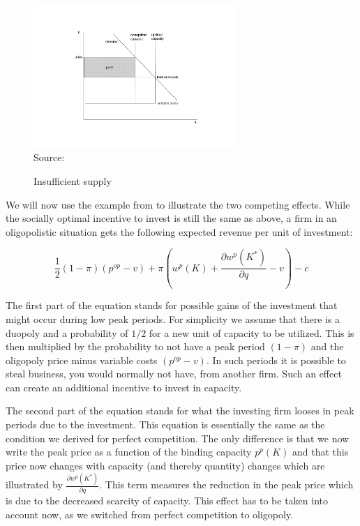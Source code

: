 \begin{figure}[h]
\centering
\caption{Insufficient supply}
\includegraphics[width=3.0in]{capacity/imperfect_spot_pricing2}
      \label{peak_load_insufficient}  
\\          
\scriptsize Source: \cite{Fehr1995}
\end{figure}

We will now use the example from \cite{Fehr1995} to illustrate the two competing effects.
While the socially optimal incentive to invest is still the same as above, a firm in an oligopolistic situation gets the following expected revenue per unit of investment:

\begin{equation*}
	\frac{1}{2} (1-\pi) (p^{op}-v) + \pi \left(w^p(K)+\frac{\partial w^p(K^*)}{\partial q}-v\right) - c
\end{equation*}

The first part of the equation stands for possible gains of the investment that might occur during low peak periods. For simplicity we assume that there is a duopoly and a probability of $1/2$ for a new unit of capacity to be utilized. This is then multiplied by the probability to not have a peak period $(1-\pi)$ and the oligopoly price minus variable costs $(p^{op}-v)$. In such periods it is possible to steal business, you would normally not have, from another firm. Such an effect can create an additional incentive to invest in capacity. %

The second part of the equation stands for what the investing firm looses in peak periods due to the investment. This equation is essentially the same as the condition we derived for perfect competition. The only difference is that we now write the peak price as a function of the binding capacity $p^p(K)$ and that this price now changes with capacity (and thereby quantity) changes which are illustrated by $\frac{\partial w^p(K^*)}{\partial q}$. This term measures the reduction in the peak price which is due to the decreased scarcity of capacity. This effect has to be taken into account now, as we switched from perfect competition to oligopoly.

